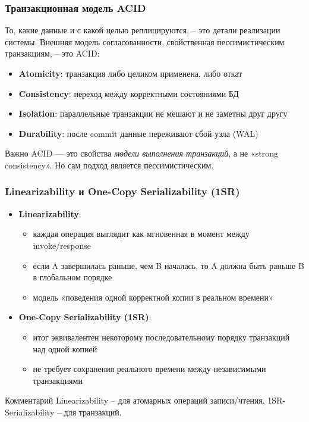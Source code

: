 \documentclass{beamer}
\begin{document}
\begin{frame}
\frametitle{Транзакционная модель ACID}

То, какие данные и с какой целью реплицируются, – это детали реализации системы.
Внешняя модель согласованности, свойственная пессимистическим транзакциям, – это ACID: \\

\begin{itemize}
  \item \textbf{Atomicity}: транзакция либо целиком применена, либо откат
  \item \textbf{Consistency}: переход между корректными состояниями БД
  \item \textbf{Isolation}: параллельные транзакции не мешают и не заметны друг другу
  \item \textbf{Durability}: после commit данные переживают сбой узла (WAL)
\end{itemize}

\begin{block}{Важно}
ACID --- это свойства \textit{модели выполнения транзакций}, а не «strong consistency». Но сам подход является пессимистическим.
\end{block}

\end{frame}

\begin{frame}
\frametitle{Linearizability и One-Copy Serializability (1SR)}

\begin{itemize}
  \item \textbf{Linearizability}:
  \begin{itemize}
    \item каждая операция выглядит как мгновенная в момент между invoke/response
    \item если A завершилась раньше, чем B началась, то A должна быть раньше B в глобальном порядке
    \item модель «поведения одной корректной копии в реальном времени»
  \end{itemize}
  \item \textbf{One-Copy Serializability (1SR)}:
  \begin{itemize}
    \item итог эквивалентен некоторому последовательному порядку транзакций над одной копией
    \item не требует сохранения реального времени между независимыми транзакциями
  \end{itemize}
\end{itemize}

\begin{block}{Комментарий}
Linearizability – для атомарных операций записи/чтения, 1SR-Serializability – для транзакций.
\end{block}

\end{frame}
\end{document}
